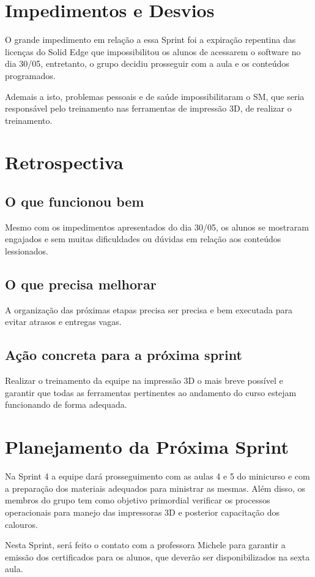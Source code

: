 \documentclass[12pt,a4paper]{article}
\begin{document}
\section{Impedimentos e Desvios}
O grande impedimento em relação a essa Sprint foi a expiração repentina das licenças do Solid Edge que impossibilitou os alunos de acessarem o software no dia 30/05, entretanto, o grupo decidiu prosseguir com a aula e os conteúdos programados.

Ademais a isto, problemas pessoais e de saúde impossibilitaram o SM, que seria responsável pelo treinamento nas ferramentas de impressão 3D, de realizar o treinamento. 

\section{Retrospectiva}
\subsection*{O que funcionou bem}
Mesmo com os impedimentos apresentados do dia 30/05, os alunos se mostraram engajados e sem muitas dificuldades ou dúvidas em relação aos conteúdos lessionados.

\subsection*{O que precisa melhorar}
A organização das próximas etapas precisa ser precisa e bem executada para evitar atrasos e entregas vagas.

\subsection*{Ação concreta para a próxima sprint}
Realizar o treinamento da equipe na impressão 3D o mais breve possível e garantir que todas as ferramentas pertinentes ao andamento do curso estejam funcionando de forma adequada.

\section{Planejamento da Próxima Sprint}
Na Sprint 4 a equipe dará prosseguimento com as aulas 4 e 5 do minicurso e com a preparação dos materiais adequados para ministrar as mesmas. Além disso, os membros do grupo tem como objetivo primordial verificar os processos operacionais para manejo das impressoras 3D e posterior capacitação dos calouros.

Nesta Sprint, será feito o contato com a professora Michele para garantir a emissão dos certificados para os alunos, que deverão ser disponibilizados na sexta aula.
\end{document}
